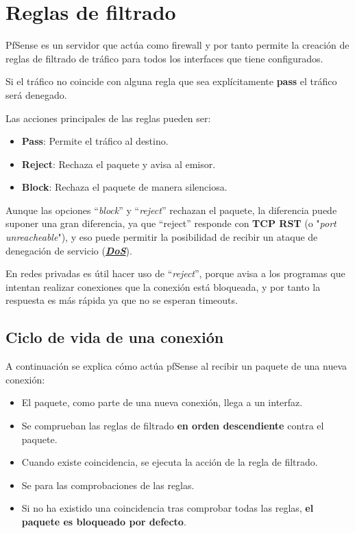 \chapter{Reglas de filtrado}
PfSense es un servidor que actúa como firewall y por tanto permite la creación de reglas de filtrado de tráfico para todos los interfaces que tiene configurados.


Si el tráfico no coincide con alguna regla que sea explícitamente \textbf{pass} el tráfico será denegado.


Las acciones principales de las reglas pueden ser:

\begin{itemize}
    \item \textbf{Pass}: Permite el tráfico al destino.
    \item \textbf{Reject}: Rechaza el paquete y avisa al emisor.
    \item \textbf{Block}: Rechaza el paquete de manera silenciosa.
\end{itemize}

Aunque las opciones “\textit{block}” y “\textit{reject}” rechazan el paquete, la diferencia puede suponer una gran diferencia, ya que “reject” responde con \textbf{TCP RST }(o "\textit{port unreacheable}"), y eso puede permitir la posibilidad de recibir un ataque de denegación de servicio (\textbf{\textit{\href{https://es.wikipedia.org/wiki/Ataque_de_denegaci\%C3\%B3n_de_servicio}{DoS}}}).


En redes privadas es útil hacer uso de “\textit{reject}”, porque avisa a los programas que intentan realizar conexiones que la conexión está bloqueada, y por tanto la respuesta es más rápida ya que no se esperan timeouts.

\hypertarget{ciclo_vida_conexiones}{}
\section{Ciclo de vida de una conexión}
A continuación se explica cómo actúa pfSense al recibir un paquete de una nueva conexión:

\begin{itemize}
    \item El paquete, como parte de una nueva conexión, llega a un interfaz.
    \item Se comprueban las reglas de filtrado \textbf{en orden descendiente} contra el paquete.
    \item Cuando existe coincidencia, se ejecuta la acción de la regla de filtrado.
    \item Se para las comprobaciones de las reglas.
    \item Si no ha existido una coincidencia tras comprobar todas las reglas, \textbf{el paquete es bloqueado por defecto}.
\end{itemize}


